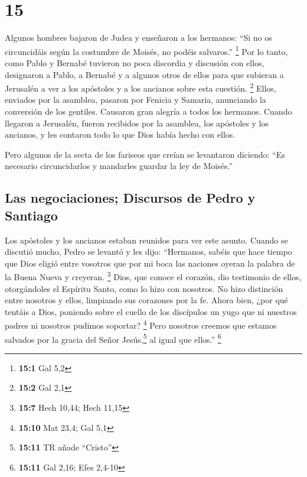 \hypertarget{section-14}{%
\section{15}\label{section-14}}

 Algunos hombres bajaron de Judea y enseñaron a los
hermanos: ``Si no os circuncidáis según la costumbre de Moisés, no
podéis salvaros.'' \footnote{\textbf{15:1} Gal 5,2}  Por
lo tanto, como Pablo y Bernabé tuvieron no poca discordia y discusión
con ellos, designaron a Pablo, a Bernabé y a algunos otros de ellos para
que subieran a Jerusalén a ver a los apóstoles y a los ancianos sobre
esta cuestión. \footnote{\textbf{15:2} Gal 2,1}  Ellos,
enviados por la asamblea, pasaron por Fenicia y Samaria, anunciando la
conversión de los gentiles. Causaron gran alegría a todos los hermanos.
 Cuando llegaron a Jerusalén, fueron recibidos por la
asamblea, los apóstoles y los ancianos, y les contaron todo lo que Dios
había hecho con ellos.

 Pero algunos de la secta de los fariseos que creían se
levantaron diciendo: ``Es necesario circuncidarlos y mandarles guardar
la ley de Moisés.''

\hypertarget{las-negociaciones-discursos-de-pedro-y-santiago}{%
\subsection{Las negociaciones; Discursos de Pedro y
Santiago}\label{las-negociaciones-discursos-de-pedro-y-santiago}}

 Los apóstoles y los ancianos estaban reunidos para ver
este asunto.  Cuando se discutió mucho, Pedro se levantó y
les dijo: ``Hermanos, sabéis que hace tiempo que Dios eligió entre
vosotros que por mi boca las naciones oyeran la palabra de la Buena
Nueva y creyeran. \footnote{\textbf{15:7} Hech 10,44; Hech 11,15}
 Dios, que conoce el corazón, dio testimonio de ellos,
otorgándoles el Espíritu Santo, como lo hizo con nosotros.
 No hizo distinción entre nosotros y ellos, limpiando sus
corazones por la fe.  Ahora bien, ¿por qué tentáis a
Dios, poniendo sobre el cuello de los discípulos un yugo que ni nuestros
padres ni nosotros pudimos soportar? \footnote{\textbf{15:10} Mat 23,4;
  Gal 5,1}  Pero nosotros creemos que estamos salvados
por la gracia del Señor Jesús,\footnote{\textbf{15:11} TR añade
  ``Cristo''} al igual que ellos.'' \footnote{\textbf{15:11} Gal 2,16;
  Efes 2,4-10}


